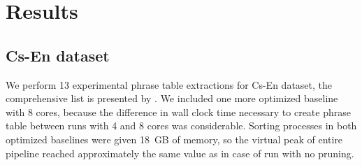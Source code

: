 \chapter{Results}
\label{chap:results}

\section{Cs-En dataset}
\label{sec:cs-en-results}

We perform 13 experimental phrase table extractions for Cs-En dataset,
the comprehensive list is presented by .
We included one more optimized baseline with 8 cores, because the difference in
wall clock time necessary to create phrase table between runs with 4 and 8 cores
was considerable.
Sorting processes in both optimized baselines were given 18~GB of memory, so the virtual
peak of entire pipeline reached approximately the same value as in case of \eppex{}
run with no pruning.


